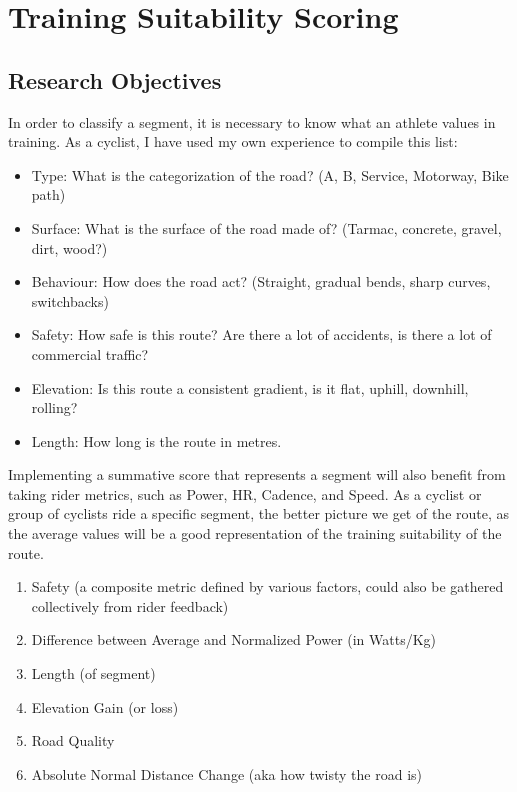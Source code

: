 \documentclass[12pt,a4paper]{report}
\begin{document}
\newpage

\section{Training Suitability Scoring}

\subsection{Research Objectives}

In order to classify a segment, it is necessary to know what an athlete values in training. As a cyclist, I have used my own experience to compile this list:

\begin{itemize}
	\item Type: What is the categorization of the road? (A, B, Service, Motorway, Bike path)
	\item Surface: What is the surface of the road made of? (Tarmac, concrete, gravel, dirt, wood?)
	\item Behaviour: How does the road act? (Straight, gradual bends, sharp curves, switchbacks)
	\item Safety: How safe is this route? Are there a lot of accidents, is there a lot of commercial traffic?
	\item Elevation: Is this route a consistent gradient, is it flat, uphill, downhill, rolling?
	\item Length: How long is the route in metres.
\end{itemize}

Implementing a summative score that represents a segment will also benefit from taking rider metrics, such as Power, HR, Cadence, and Speed.
As a cyclist or group of cyclists ride a specific segment, the better picture we get of the route, as the average values will be a good representation
of the training suitability of the route.
\begin{enumerate}
	\item Safety (a composite metric defined by various factors, could also be gathered collectively from rider feedback)
	\item Difference between Average and Normalized Power (in Watts/Kg)
	\item Length (of segment)
	\item Elevation Gain (or loss)
	\item Road Quality
	\item Absolute Normal Distance Change (aka how twisty the road is)
\end{enumerate}
\end{document}
